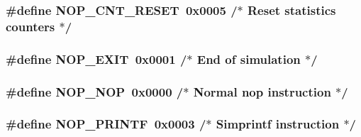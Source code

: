 \hypertarget{spr-defs_8h_adb30fdbe57996577b5bec561ebb75953}{
\subsubsection[{\-N\-O\-P\-\_\-\-C\-N\-T\-\_\-\-R\-E\-S\-E\-T}]{\setlength{\rightskip}{0pt plus 5cm}\#define {\bf \-N\-O\-P\-\_\-\-C\-N\-T\-\_\-\-R\-E\-S\-E\-T}~0x0005	    /$\ast$ Reset statistics counters $\ast$/}}\label{spr-defs_8h_adb30fdbe57996577b5bec561ebb75953}
\hypertarget{spr-defs_8h_a687b241988bb87d7182975a0579f0937}{
\subsubsection[{\-N\-O\-P\-\_\-\-E\-X\-I\-T}]{\setlength{\rightskip}{0pt plus 5cm}\#define {\bf \-N\-O\-P\-\_\-\-E\-X\-I\-T}~0x0001      /$\ast$ End of simulation $\ast$/}}\label{spr-defs_8h_a687b241988bb87d7182975a0579f0937}
\hypertarget{spr-defs_8h_a47cf8c2c09f5c42e8ca6a7673f052b6c}{
\subsubsection[{\-N\-O\-P\-\_\-\-N\-O\-P}]{\setlength{\rightskip}{0pt plus 5cm}\#define {\bf \-N\-O\-P\-\_\-\-N\-O\-P}~0x0000      /$\ast$ Normal nop instruction $\ast$/}}\label{spr-defs_8h_a47cf8c2c09f5c42e8ca6a7673f052b6c}
\hypertarget{spr-defs_8h_a61a725892ee94ce621441efbe3a39bdf}{
\subsubsection[{\-N\-O\-P\-\_\-\-P\-R\-I\-N\-T\-F}]{\setlength{\rightskip}{0pt plus 5cm}\#define {\bf \-N\-O\-P\-\_\-\-P\-R\-I\-N\-T\-F}~0x0003      /$\ast$ Simprintf instruction $\ast$/}}\label{spr-defs_8h_a61a725892ee94ce621441efbe3a39bdf}
